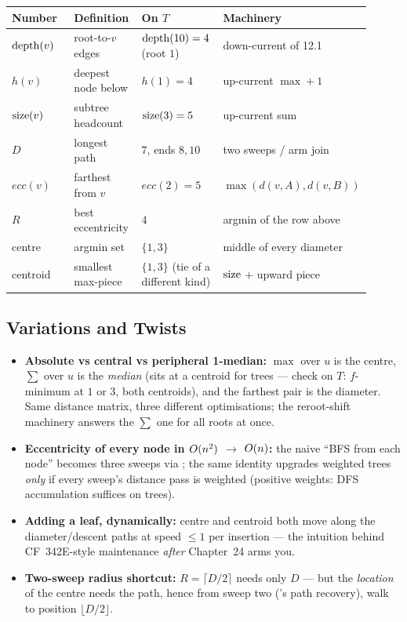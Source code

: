 \begin{center}
\small
\renewcommand{\arraystretch}{1.25}
\begin{tabular}{@{}p{0.21\linewidth} p{0.20\linewidth} p{0.24\linewidth} p{0.26\linewidth}@{}}
\toprule
\textbf{Number} & \textbf{Definition} & \textbf{On $T$} & \textbf{Machinery} \\
\midrule
$\operatorname{depth}(v)$ & root-to-$v$ edges & $\operatorname{depth}(10)=4$ (root $1$) & down-current of 12.1 \\
$h(v)$ & deepest node below & $h(1)=4$ & up-current $\max+1$ \\
$\operatorname{size}(v)$ & subtree headcount & $\operatorname{size}(3)=5$ & up-current sum \\
$D$ & longest path & $7$, ends $8,10$ & two sweeps / arm join \\
$\mathit{ecc}(v)$ & farthest from $v$ & $\mathit{ecc}(2)=5$ & $\max(d(v,A),d(v,B))$ \\
$R$ & best eccentricity & $4$ & argmin of the row above \\
centre & argmin set & $\{1,3\}$ & middle of every diameter \\
centroid & smallest max-piece & $\{1,3\}$ (tie of a different kind) & $\operatorname{size}$ + upward piece \\
\bottomrule
\end{tabular}
\end{center}

\subsection{Variations and Twists}

\begin{itemize}[nosep]
  \item \textbf{Absolute vs central vs peripheral 1-median:} $\max$ over $u$ is the
        centre, $\sum$ over $u$ is the \emph{median} (sits at a centroid for trees ---
        check on $T$: $f$-minimum at $1$ or $3$, both centroids), and the farthest pair
        is the diameter. Same distance matrix, three different optimisations; the
        reroot-shift machinery answers the $\sum$ one for all roots at once. \hfill{}
  \item \textbf{Eccentricity of every node in $O(n^2)$ $\to$ $O(n)$:} the naive
        ``BFS from each node'' becomes three sweeps via ; the same
        identity upgrades weighted trees \emph{only} if every sweep's distance pass is
        weighted (positive weights: DFS accumulation suffices on trees). \hfill{}
  \item \textbf{Adding a leaf, dynamically:} centre and centroid both move along the
        diameter/descent paths at speed $\le 1$ per insertion --- the intuition behind
        CF~342E-style maintenance \emph{after} Chapter~24 arms you. \hfill{}
  \item \textbf{Two-sweep radius shortcut:} $R = \lceil D/2 \rceil$ needs only $D$ ---
        but the \emph{location} of the centre needs the path, hence  from
        sweep two ('s path recovery), walk to position
        $\lfloor D/2 \rfloor$. \hfill{}
\end{itemize}

